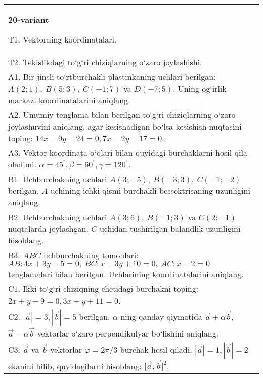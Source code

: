 \documentclass{article}
\begin{document}
\begin{tabular}{m{17cm}}
\textbf{20-variant}

T1. 
Vektorning koordinatalari.
 \\
T2. 
Tekislikdagi to‘g‘ri chiziqlarning o‘zaro joylashishi.
 \\
A1. 
Bir jinsli to‘rtburchakli plastinkaning uchlari berilgan:
$A (2;1), \ B (5;3), \ C (-1;7) $ va $D (-7;5) $. Uning og‘irlik markazi
koordinatalarini aniqlang.
 \\
A2. 
Umumiy tenglama bilan berilgan to‘g‘ri chiziqlarning
o‘zaro joylashuvini aniqlang, agar kesishadigan bo‘lsa kesishish nuqtasini
toping: $14x-9y-24=0, 7x-2y-17=0$.
 \\
A3. 
Vektor koordinata o‘qlari bilan quyidagi burchaklarni hosil qila oladimi:
$\alpha = 45^{{^\circ}},\beta = 60^{{^\circ}},\gamma = 120^{{^\circ}}$.
 \\
B1. 
Uchburchakning uchlari
\(A (3;-5),\ B (-3;3),\ C (-1;-2) \) berilgan. $A$ uchining ichki qismi
burchakli bessektrisaning uzunligini aniqlang.
 \\
B2. 
Uchburchakning uchlari \(A (3;6),\ B (-1;3) \) va
\(C (2:-1) \) nuqtalarda joylashgan. $C$ uchidan tushirilgan balandlik uzunligini hisoblang.
 \\
B3. 
$ABC$ uchburchakning tomonlari:
\(AB:4x+3y-5=0,\ BC:x-3y+10=0,\ AC:x-2=0\) 
tenglamalari bilan berilgan. Uchlarining koordinatalarini aniqlang.
 \\
C1. 
Ikki to‘g‘ri chiziqning chetidagi burchakni toping: $2x+y-9=0, 3x-y+11=0$.
 \\
C2. 
$|\vec{a}| = 3,|\vec{b}| = 5$ berilgan. $\alpha$ ning qanday qiymatida $\vec{a} + \alpha\vec{b}$, $\vec{a} - \alpha\vec{b}$ vektorlar o‘zaro perpendikulyar bo‘lishini aniqlang.
 \\
C3. 
$\vec{a}$ va $\vec{b}$ vektorlar $\varphi = 2\pi/3$ burchak hosil qiladi. $|\vec{a}| = 1,|\vec{b}| = 2$ ekanini bilib, quyidagilarni hisoblang:
$\lbrack\vec{a},\vec{b}\rbrack^{2}$.
 \\

\end{tabular}
\vspace{1cm}
\end{document}
